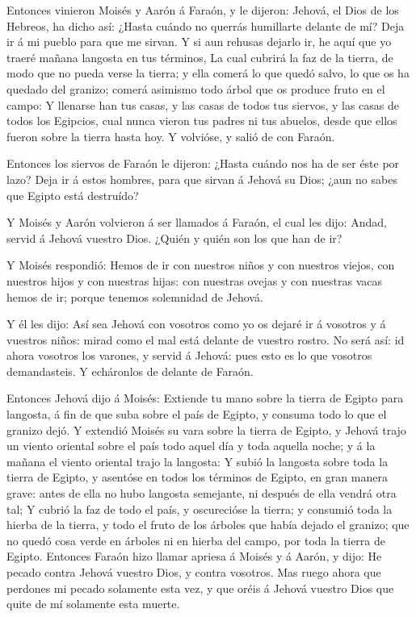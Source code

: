  Entonces vinieron Moisés y Aarón á Faraón, y le dijeron:
Jehová, el Dios de los Hebreos, ha dicho así: ¿Hasta cuándo no querrás
humillarte delante de mí? Deja ir á mi pueblo para que me sirvan.
 Y si aun rehusas dejarlo ir, he aquí que yo traeré mañana
langosta en tus términos,  La cual cubrirá la faz de la
tierra, de modo que no pueda verse la tierra; y ella comerá lo que quedó
salvo, lo que os ha quedado del granizo; comerá asimismo todo árbol que
os produce fruto en el campo:  Y llenarse han tus casas, y
las casas de todos tus siervos, y las casas de todos los Egipcios, cual
nunca vieron tus padres ni tus abuelos, desde que ellos fueron sobre la
tierra hasta hoy. Y volvióse, y salió de con Faraón.

 Entonces los siervos de Faraón le dijeron: ¿Hasta cuándo
nos ha de ser éste por lazo? Deja ir á estos hombres, para que sirvan á
Jehová su Dios; ¿aun no sabes que Egipto está destruído?

 Y Moisés y Aarón volvieron á ser llamados á Faraón, el
cual les dijo: Andad, servid á Jehová vuestro Dios. ¿Quién y quién son
los que han de ir?

 Y Moisés respondió: Hemos de ir con nuestros niños y con
nuestros viejos, con nuestros hijos y con nuestras hijas: con nuestras
ovejas y con nuestras vacas hemos de ir; porque tenemos solemnidad de
Jehová.

 Y él les dijo: Así sea Jehová con vosotros como yo os
dejaré ir á vosotros y á vuestros niños: mirad como el mal está delante
de vuestro rostro.  No será así: id ahora vosotros los
varones, y servid á Jehová: pues esto es lo que vosotros demandasteis. Y
echáronlos de delante de Faraón.

 Entonces Jehová dijo á Moisés: Extiende tu mano sobre la
tierra de Egipto para langosta, á fin de que suba sobre el país de
Egipto, y consuma todo lo que el granizo dejó.  Y
extendió Moisés su vara sobre la tierra de Egipto, y Jehová trajo un
viento oriental sobre el país todo aquel día y toda aquella noche; y á
la mañana el viento oriental trajo la langosta:  Y subió
la langosta sobre toda la tierra de Egipto, y asentóse en todos los
términos de Egipto, en gran manera grave: antes de ella no hubo langosta
semejante, ni después de ella vendrá otra tal;  Y cubrió
la faz de todo el país, y oscurecióse la tierra; y consumió toda la
hierba de la tierra, y todo el fruto de los árboles que había dejado el
granizo; que no quedó cosa verde en árboles ni en hierba del campo, por
toda la tierra de Egipto.  Entonces Faraón hizo llamar
apriesa á Moisés y á Aarón, y dijo: He pecado contra Jehová vuestro
Dios, y contra vosotros.  Mas ruego ahora que perdones mi
pecado solamente esta vez, y que oréis á Jehová vuestro Dios que quite
de mí solamente esta muerte.

